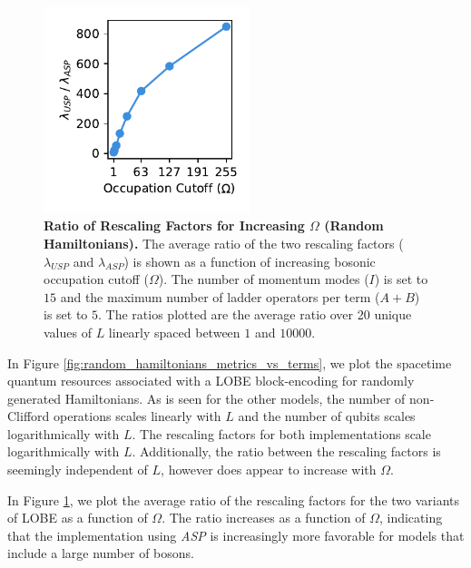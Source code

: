 \begin{figure}
    \centering
    \includegraphics[width=6cm]{figures/random_hamiltonians_rescaling_factor_ratios_vs_omega.pdf}
    \caption{
        \textbf{Ratio of Rescaling Factors for Increasing $\Omega$ (Random Hamiltonians).}
        The average ratio of the two rescaling factors ($\lambda_{USP}$ and $\lambda_{ASP}$) is shown as a function of increasing bosonic occupation cutoff ($\Omega$).
        The number of momentum modes ($I$) is set to $15$ and the maximum number of ladder operators per term ($A + B$) is set to $5$.
        The ratios plotted are the average ratio over 20 unique values of $L$ linearly spaced between $1$ and $10000$.
    }
    \label{fig:random_hamiltonians_rescaling_factor_ratios_vs_omega}
\end{figure}

In Figure \ref{fig:random_hamiltonians_metrics_vs_terms}, we plot the spacetime quantum resources associated with a LOBE block-encoding for randomly generated Hamiltonians.
As is seen for the other models, the number of non-Clifford operations scales linearly with $L$ and the number of qubits scales logarithmically with $L$.
The rescaling factors for both implementations scale logarithmically with $L$.
Additionally, the ratio between the rescaling factors is seemingly independent of $L$, however does appear to increase with $\Omega$.

In Figure \ref{fig:random_hamiltonians_rescaling_factor_ratios_vs_omega}, we plot the average ratio of the rescaling factors for the two variants of LOBE as a function of $\Omega$.
The ratio increases as a function of $\Omega$, indicating that the implementation using \textit{ASP} is increasingly more favorable for models that include a large number of bosons.

